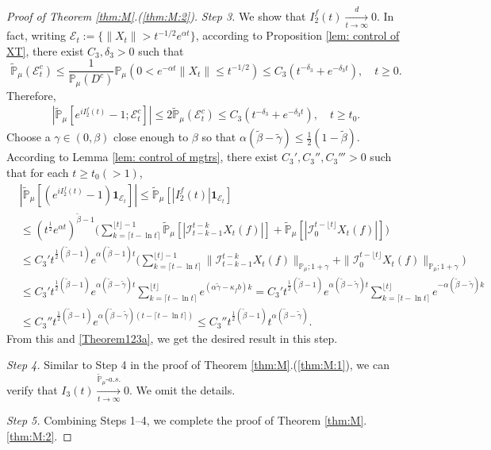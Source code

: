 \documentclass[12pt,a4paper]{amsart}
\theoremstyle{plain}
\theoremstyle{definition}
\numberwithin{equation}{section}
\begin{document}
\begin{proof}[Proof of Theorem \ref{thm:M}.(\ref{thm:M:2})]
  \emph{Step 3.}
  We show that $ I^f_2(t)\xrightarrow[t\to \infty]{d} 0$.
  In fact, writing $\mathcal{E}_t:=\{\|X_t\|>t^{-1/2}e^{\alpha t}\}$, according to Proposition \ref{lem: control of XT}, there exist $C_3, \delta_3>0$ such that
  \[
    \mathbb{\widetilde{P}}_{\mu}(\mathcal{E}^c_t)
    \leq \frac{1}{\mathbb{P}_{\mu}(D^c)}\mathbb{P}_{\mu}(0<e^{-\alpha t}\|X_t\|\leq t^{-1/2})\leq C_3( t^{-\delta_3}+e^{-\delta_3 t})
    , \quad t\geq0.
  \]
  Therefore,
  \begin{align}
   \label{Theorem123a}
    |\mathbb{\widetilde{P}}_{\mu}[e^{i I^f_2(t)}-1;\mathcal{E}^c_t]|
    \leq 2\mathbb{\widetilde{P}}_{\mu}(\mathcal{E}^c_t)
    \leq C_3(t^{-\delta_3}+e^{-\delta_3 t}),
    \quad t\geq t_0.
  \end{align}
  Choose a $\gamma\in (0,\beta)$ close enough to $\beta$ so that $\alpha(\tilde \beta - \tilde \gamma) \leq \frac{1}{2}(1- \tilde \beta)$.
	According to Lemma \ref{lem: control of mgtrs}, there exist $C_3',C_3'',C_3'''>0$ such that for each $t\geq t_0 (>1)$,
  \begin{align}
    & |\mathbb{\widetilde{P}}_{\mu} [ (e^{i I^f_2(t)}-1)\mathbf{1}_{\mathcal{E}_t}]|
      \leq  \mathbb{\widetilde{P}}_{\mu} [ |I^f_2(t)|\mathbf{1}_{\mathcal{E}_t}] \\
    & \leq  (t^{\frac{1}{2}} e^{\alpha t} )^{\tilde \beta - 1}\Big(\sum_{k=\lceil t-\ln t \rceil}^{\lfloor t \rfloor - 1}\mathbb{\widetilde{P}}_{\mu} [| \mathcal{I}_{t-k-1}^{t-k} X_t(f) |] + \mathbb{\widetilde{P}}_{\mu}[| \mathcal{I}_{0}^{t-\lfloor t\rfloor} X_t(f)|]\Big) \\
    & \leq C_3' t^{\frac{1}{2}(\tilde \beta - 1)} e^{\alpha(\tilde \beta - 1)t}\Big(\sum_{k=\lceil t-\ln t \rceil}^{\lfloor t \rfloor - 1}\|\mathcal{I}_{t-k-1}^{t-k} X_t(f) \|_{\mathbb P_\mu; 1+\gamma} + \|\mathcal I_0^{t-\lfloor t \rfloor} X_t(f)\|_{\mathbb P_\mu;1+\gamma}\Big) \\
    & \leq C_3' t^{\frac{1}{2}(\tilde \beta - 1)} e^{\alpha (\tilde \beta - \tilde \gamma)t}\sum_{k=\lceil t-\ln t \rceil}^{\lfloor t \rfloor}  e^{(\alpha\tilde \gamma-\kappa_f b)k}
      = C_3' t^{\frac{1}{2}(\tilde \beta - 1)} e^{\alpha(\tilde \beta - \tilde \gamma) t}\sum_{k=\lceil t-\ln t \rceil}^{\lfloor t \rfloor}  e^{-\alpha (\tilde \beta -\tilde \gamma) k}
    \\ & \leq C_3'' t^{\frac{1}{2}(\tilde \beta - 1)} e^{\alpha (\tilde \beta - \tilde \gamma)(t - \lceil t - \ln t\rceil)}
         \leq C_3'' t^{\frac{1}{2}(\tilde \beta - 1)} t^{\alpha (\tilde \beta - \tilde \gamma)}.
  \end{align}
  From this and \eqref{Theorem123a}, we get the desired result in this step.

  \emph{Step 4.} Similar to Step 4 in the proof of Theorem \ref{thm:M}.(\ref{thm:M:1}), we can verify that $I_3(t) \xrightarrow[t\to \infty]{\widetilde {\mathbb P}_\mu \text{-} a.s.} 0$.
  We omit the details.

 	\emph{Step 5.} Combining Steps 1--4, we complete the proof of Theorem \ref{thm:M}.\eqref{thm:M:2}.
\end{proof}
\end{document}

